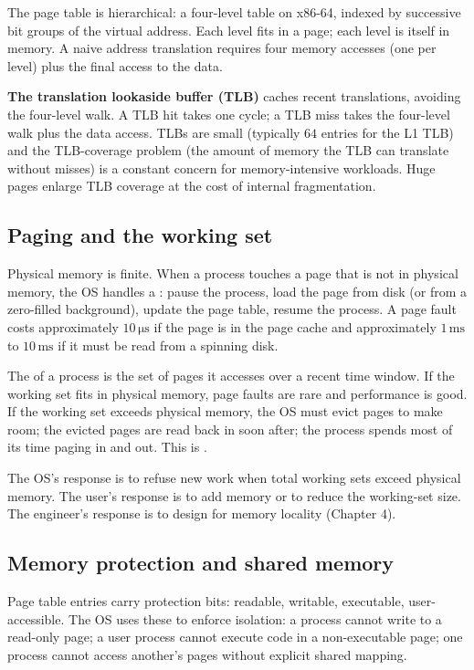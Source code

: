 The page table is hierarchical: a four-level table on x86-64, indexed by successive bit groups of the virtual address. Each level fits in a page; each level is itself in memory. A naive address translation requires four memory accesses (one per level) plus the final access to the data.

\textbf{The translation lookaside buffer (TLB)} caches recent translations, avoiding the four-level walk. A TLB hit takes one cycle; a TLB miss takes the four-level walk plus the data access. TLBs are small (typically $64$ entries for the L1 TLB) and the TLB-coverage problem (the amount of memory the TLB can translate without misses) is a constant concern for memory-intensive workloads. Huge pages enlarge TLB coverage at the cost of internal fragmentation.

\subsection{Paging and the working set}

Physical memory is finite. When a process touches a page that is not in physical memory, the OS handles a : pause the process, load the page from disk (or from a zero-filled background), update the page table, resume the process. A page fault costs approximately $10\,\si{\micro\second}$ if the page is in the page cache and approximately $1\,\si{\milli\second}$ to $10\,\si{\milli\second}$ if it must be read from a spinning disk.

The  of a process is the set of pages it accesses over a recent time window. If the working set fits in physical memory, page faults are rare and performance is good. If the working set exceeds physical memory, the OS must evict pages to make room; the evicted pages are read back in soon after; the process spends most of its time paging in and out. This is .

The OS's response is to refuse new work when total working sets exceed physical memory. The user's response is to add memory or to reduce the working-set size. The engineer's response is to design for memory locality (Chapter 4).

\subsection{Memory protection and shared memory}

Page table entries carry protection bits: readable, writable, executable, user-accessible. The OS uses these to enforce isolation: a process cannot write to a read-only page; a user process cannot execute code in a non-executable page; one process cannot access another's pages without explicit shared mapping.

